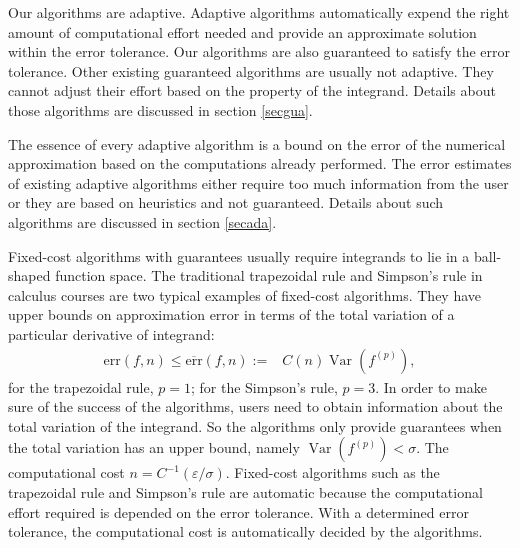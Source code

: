 \documentclass{iitthesis}
\DeclareMathOperator{\Var}{Var}
\theoremstyle{definition}
\theoremstyle{remark}
\begin{document}
Our algorithms are adaptive. Adaptive algorithms automatically expend the right amount of computational effort needed and provide an approximate solution within the error tolerance. Our algorithms are also guaranteed to satisfy the error tolerance. Other existing guaranteed algorithms are usually not adaptive. They cannot adjust their effort based on the property of the integrand. Details about those algorithms are discussed in section \ref{secgua}.

The essence of every adaptive algorithm is a bound on the error of the numerical approximation based on the computations already performed. The error estimates of existing adaptive algorithms either require too much information from the user or they are based on heuristics and not guaranteed. Details about such algorithms are discussed in section \ref{secada}.

\label{secgua}

Fixed-cost algorithms with guarantees usually require integrands to lie in a ball-shaped function space. The traditional trapezoidal rule and Simpson's rule in calculus courses are two typical examples of fixed-cost algorithms. They have upper bounds on approximation error in terms of the total variation of a particular derivative of integrand:
\begin{align}\label{errorsimple}
    \text{err}(f,n)\le\overline{\text{err}}(f,n):=&C(n)\Var(f^{(p)}),
\end{align}
for the trapezoidal rule, $p=1$; for the Simpson's rule, $p=3$. In order to make sure of the success of the algorithms, users need to obtain information about the total variation of the integrand. So the algorithms only provide guarantees when the total variation has an upper bound, namely $\Var(f^{(p)})<\sigma$. The computational cost $n=C^{-1}(\varepsilon/\sigma)$. Fixed-cost algorithms such as the trapezoidal rule and Simpson's rule are automatic because the computational effort required is depended on the error tolerance. With a determined error tolerance, the computational cost is automatically decided by the algorithms.
\end{document}
